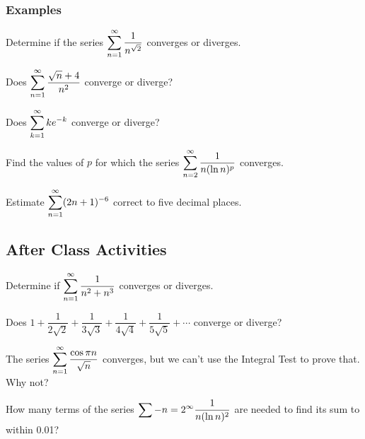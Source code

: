 \documentclass[notes]{subfiles}
\begin{document}
	\subsubsection*{Examples}
		\begin{ex}
			Determine if the series $\displaystyle \sum_{n = 1}^\infty \dfrac{1}{n^{\sqrt{2}}}$ converges or diverges.
		\end{ex}
			
		\begin{ex}
			Does $\displaystyle \sum_{n = 1}^\infty \dfrac{\sqrt{n} + 4}{n^2}$ converge or diverge?
		\end{ex}
			
		\begin{ex}
			Does $\displaystyle \sum_{k = 1}^\infty ke^{-k}$ converge or diverge?
		\end{ex}
			\newpage
			
		\begin{ex}
			Find the values of $p$ for which the series $\displaystyle \sum_{n = 2}^\infty \dfrac{1}{n(\ln n)^p}$ converges.
		\end{ex}
			
		\begin{ex}
			Estimate $\displaystyle \sum_{n = 1}^\infty (2n + 1)^{-6}$ correct to five decimal places.
		\end{ex}
			\newpage
			
			
	\subsection*{After Class Activities}
		\begin{ex}
			Determine if $\displaystyle \sum_{n =1 }^\infty \dfrac{1}{n^2 + n^3}$ converges or diverges.
		\end{ex}
			
		\begin{ex}
			Does $1 + \dfrac{1}{2\sqrt{2}} + \dfrac{1}{3\sqrt{3}} + \dfrac{1}{4\sqrt{4}} + \dfrac{1}{5\sqrt{5}}+ \cdots$ converge or diverge?
		\end{ex}
			
		\begin{ex}
			The series $\displaystyle \sum_{n = 1}^\infty \dfrac{\cos \pi n}{\sqrt{n}}$ converges, but we can't use the Integral Test to prove that.  Why not?
		\end{ex}
			
		\begin{ex}
			How many terms of the series $\displaystyle \sum-{n =2}^\infty \dfrac{1}{n(\ln n)^2}$ are needed to find its sum to within 0.01?
		\end{ex}
\clearpage
\end{document}
